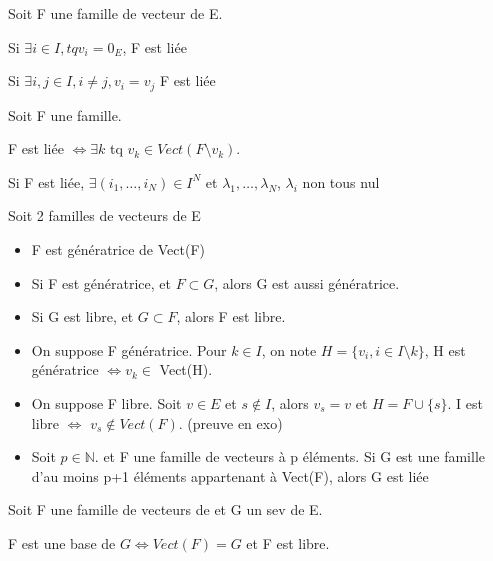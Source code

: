 \documentclass[french]{yLectureNote}
\newcommand{\N}[0]{\mathbb{N}}
\begin{document}
\begin{proposition}
Soit F une famille de vecteur de E.

Si \(\exists i\in I, tq v_i = 0_E\), F est liée

Si \(\exists i,j\in I, i\neq j, v_i=v_j\) F est liée
\end{proposition}
\begin{proposition}
Soit F une famille.

F est liée \(\iff \exists k\) tq \(v_k \in Vect(F \setminus v_k)\).
\end{proposition}
\begin{proposition}
Si F est liée, \(\exists (i_1,\dots, i_N)\in I^N\) et \(\lambda_1,\dots,\lambda_N\), \(\lambda_i\) non tous nul

\end{proposition}
\begin{proposition}
Soit 2 familles de vecteurs de E

\begin{itemize}
 \item F est génératrice de Vect(F)
 \item Si F est génératrice, et \(F\subset G\), alors G est aussi génératrice.
 \item Si G est libre, et \(G\subset F\), alors F est libre.
 \item On suppose F génératrice. Pour \(k\in I\), on note \(H =\{v_i, i\in I \setminus k\}\),  H est génératrice  \(\iff v_k\in\) Vect(H).
 \item On suppose F libre. Soit \(v \in E\) et \(s\notin I\), alors \(v_s=v\) et \(H = F\cup \{s\}\). I est libre \(\iff\) \(v_s \notin Vect(F)\). (preuve en exo)
 \item Soit \(p\in \N\). et F une famille de vecteurs à p éléments. Si G est une famille d'au moins p+1 éléments appartenant à Vect(F), alors G est liée
\end{itemize}
\end{proposition}
\begin{definition}[Base]
Soit F une famille de vecteurs de et G un sev de E.

F est une base de \(G \iff Vect(F) = G\) et F est libre.
\end{definition}
\end{document}
